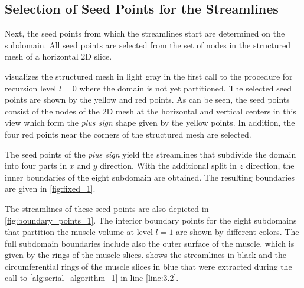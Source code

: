 \subsection{Selection of Seed Points for the Streamlines}\label{sec:selection_of_seed_points}

Next, the seed points from which the streamlines start are determined on the subdomain.
All seed points are selected from the set of nodes in the structured mesh of a horizontal 2D slice. 

 visualizes the structured mesh in light gray in the first call to the procedure for recursion level $l=0$ where the domain is not yet partitioned.
The selected seed points are shown by the yellow and red points.
As can be seen, the seed points consist of the nodes of the 2D mesh at the horizontal and vertical centers in this view which form the \emph{plus sign} shape given by the yellow points.
In addition, the four red points near the corners of the structured mesh are selected.

The seed points of the \emph{plus sign} yield the streamlines that subdivide the domain into four parts in $x$ and $y$ direction. With the additional split in $z$ direction, the inner boundaries of the eight subdomain are obtained. The resulting boundaries are given in \cref{fig:fixed_1}.

The streamlines of these seed points are also depicted in \cref{fig:boundary_points_1}. The interior boundary points for the eight subdomains that partition the muscle volume at level $l=1$ are shown by different colors.
The full subdomain boundaries include also the outer surface of the muscle, which is given by the rings of the muscle slices.
 shows the streamlines in black and the circumferential rings of the muscle slices in blue that were extracted during the call to \cref{alg:serial_algorithm_1} in line \ref{line:3.2}. 


